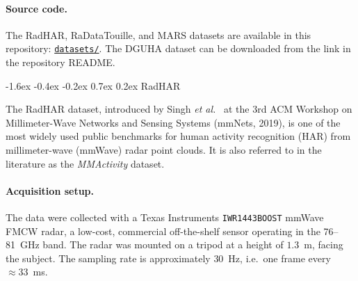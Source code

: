 \documentclass[10pt,twocolumn]{article}
\makeatletter
\renewcommand{\subsection}{%
  \@startsection{subsection}{2}{\z@}%
  {-1.6ex \@plus -0.4ex \@minus -0.2ex}%
  {0.7ex \@plus 0.2ex}%
  {\normalfont\normalsize\bfseries}}
\makeatother
\begin{document}
\paragraph{Source code.}
The RadHAR, RaDataTouille, and MARS datasets are available in this repository:
\href{https://github.com/El-oan/radar_machine_learning/tree/main/datasets}{\texttt{datasets/}}. 
The DGUHA dataset can be downloaded from the link in the repository README.

\begin{table}[t]
\centering
{}
\end{table}

\subsection{RadHAR}
\label{sec:radhar}

The RadHAR dataset, introduced by Singh \textit{et al.}~\cite{singh2019radhar}
at the 3rd ACM Workshop on Millimeter-Wave Networks and Sensing Systems
(mmNets, 2019), is one of the most widely used public benchmarks for human
activity recognition (HAR) from millimeter-wave (mmWave) radar point clouds.
It is also referred to in the literature as the \emph{MMActivity} dataset.

\paragraph{Acquisition setup.}
The data were collected with a Texas Instruments \texttt{IWR1443BOOST} mmWave FMCW
radar, a low-cost, commercial off-the-shelf sensor operating in the
76--81~GHz band. The radar was mounted on a tripod at a height of
$1.3$~m, facing the subject. The sampling rate is approximately $30$~Hz, i.e.\ one frame
every $\approx 33$~ms.
\end{document}

